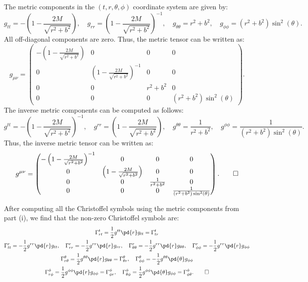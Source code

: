 \begin{solution}[(i)]
  The metric components in the $(t, r, \theta, \phi)$ coordinate system are given by:
  \[%
    g_{tt} = -\left(1 - \frac{2M}{\sqrt{r^2 + b^2}}\right), \quad g_{rr} = \left(1 - \frac{2M}{\sqrt{r^2 + b^2}}\right)^{-1}, \quad g_{\theta\theta} = r^2 + b^2, \quad g_{\phi\phi} = (r^2 + b^2)\sin^2(\theta)
  .\]%
  All off-diagonal components are zero. Thus, the metric tensor can be written as:
  \[%
    g_{\mu\nu} = \begin{pmatrix}
      -\left(1 - \frac{2M}{\sqrt{r^2 + b^2}}\right) & 0 & 0 & 0 \\
      0 & \left(1 - \frac{2M}{\sqrt{r^2 + b^2}}\right)^{-1} & 0 & 0 \\
      0 & 0 & r^2 + b^2 & 0 \\
      0 & 0 & 0 & (r^2 + b^2)\sin^2(\theta)
    \end{pmatrix}
  .\]%
  The inverse metric components can be computed as follows:
  \[%
    g^{tt} = -\left(1 - \frac{2M}{\sqrt{r^2 + b^2}}\right)^{-1}, \quad g^{rr} = \left(1 - \frac{2M}{\sqrt{r^2 + b^2}}\right), \quad g^{\theta\theta} = \frac{1}{r^2 + b^2}, \quad g^{\phi\phi} = \frac{1}{(r^2 + b^2)\sin^2(\theta)}
  .\]%
  Thus, the inverse metric tensor can be written as:
  \[%
    g^{\mu\nu} = \begin{pmatrix}
      -\left(1 - \frac{2M}{\sqrt{r^2 + b^2}}\right)^{-1} & 0 & 0 & 0 \\
      0 & \left(1 - \frac{2M}{\sqrt{r^2 + b^2}}\right) & 0 & 0 \\
      0 & 0 & \frac{1}{r^2 + b^2} & 0 \\
      0 & 0 & 0 & \frac{1}{(r^2 + b^2)\sin^2(\theta)}
    \end{pmatrix}
  .\qedhere\]%
\end{solution}

\begin{solution}[(ii)]
  After computing all the Christoffel symbols using the metric components from part (i), we find that the non-zero Christoffel symbols are:
  \begin{gather*}
    \Gamma_{rt}^t = \frac{1}{2}g^{tt}\pd{r}g_{tt} = \Gamma_{tr}^t \\
    \Gamma_{tt}^r = -\frac{1}{2}g^{rr}\pd{r}g_{tt}, \quad \Gamma_{rr}^r = -\frac{1}{2}g^{rr}\pd{r}g_{rr}, \quad \Gamma_{\theta\theta}^r = -\frac{1}{2}g^{rr}\pd{r}g_{\theta\theta}, \quad \Gamma_{\phi\phi}^r = -\frac{1}{2}g^{rr}\pd{r}g_{\phi\phi} \\
    \Gamma_{r\theta}^\theta = \frac{1}{2}g^{\theta\theta}\pd{r}g_{\theta\theta} = \Gamma_{\theta r}^\theta, \quad \Gamma_{\phi\phi}^\theta = -\frac{1}{2}g^{\theta\theta}\pd{\theta}g_{\phi\phi} \\
    \Gamma_{r\phi}^\phi = \frac{1}{2}g^{\phi\phi}\pd{r}g_{\phi\phi} = \Gamma_{\phi r}^\phi, \quad \Gamma_{\theta\phi}^\phi = \frac{1}{2}g^{\phi\phi}\pd{\theta}g_{\phi\phi} = \Gamma_{\phi\theta}^\phi
  .\qedhere\end{gather*}
\end{solution}

